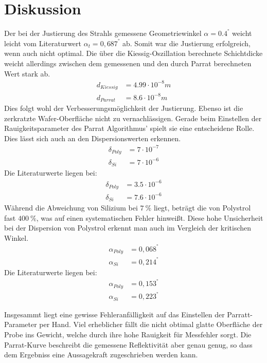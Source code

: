 \section{Diskussion}
\label{sec:Diskussion}

Der bei der Justierung des Strahls gemessene Geometriewinkel $\alpha = 0.4^°$ weicht leicht vom Literaturwert $\alpha_{t} = 0,687^°$ ab.
Somit war die Justierung erfolgreich, wenn auch nicht optimal.
Die über die Kiessig-Oszillation berechnete Schichtdicke weicht allerdings zwischen dem gemessenen 
und den durch Parrat berechneten Wert stark ab.
\begin{align*}
    d_{Kiessig} &= 4.99 \cdot 10^{-8} m \\
    d_{Parrat} &= 8.6 \cdot 10^{-8} m
\end{align*}
Dies folgt wohl der Verbesserungsmöglichkeit der Justierung.
Ebenso ist die zerkratzte Wafer-Oberfläche nicht zu vernachlässigen.
Gerade beim Einstellen der Rauigkeitsparameter des Parrat Algorithmus' spielt sie eine entscheidene Rolle.
Dies lässt sich auch an den Dispersionswerten erkennen.
\begin{align*}
    \delta_{Poly} &= 7 \cdot 10^{-7}  \\
    \delta_{Si} &= 7 \cdot 10^{-6} 
\end{align*}
Die Literaturwerte \cite{wert} liegen bei:
\begin{align*}
    \delta_{Poly} &= 3.5 \cdot 10^{-6}  \\
    \delta_{Si} &= 7.6 \cdot 10^{-6} 
\end{align*}
Während die Abweichung von Silizium bei $\qty{7}{\percent}$ liegt, beträgt die von Polystrol fast $\qty{400}{\percent}$,
was auf einen systematischen Fehler hinweißt.
Diese hohe Unsicherheit bei der Dispersion von Polystrol erkennt man auch im Vergleich der kritischen Winkel.
\begin{align*}
    \alpha_{Poly} &= 0,068^°  \\
    \alpha_{Si} &= 0,214^°
\end{align*}
Die Literaturwerte \cite{wert} liegen bei:
\begin{align*}
    \alpha_{Poly} &= 0,153^°  \\
    \alpha_{Si} &= 0,223^°
\end{align*}

Insgesammt liegt eine gewisse Fehleranfälligkeit auf das Einstellen der Parratt-Parameter per Hand.
Viel erheblicher fällt die nicht obtimal glatte Oberfläche der Probe ins Gewicht,
welche durch ihre hohe Rauigkeit für Messfehler sorgt. 
Die Parrat-Kurve beschreibt die gemessene Reflektivität aber genau genug, 
so dass dem Ergebniss eine Aussagekraft zugeschrieben werden kann.